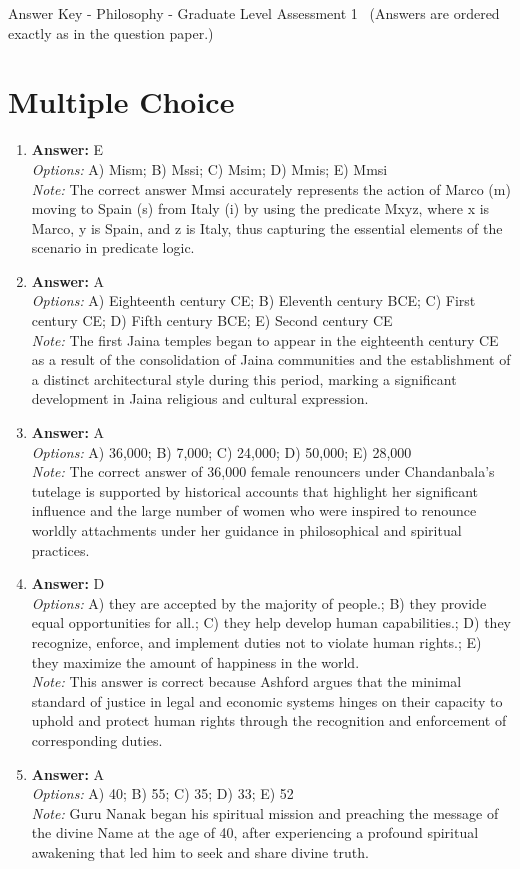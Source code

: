 \documentclass[12pt]{article}
\begin{document}
\begin{center}
Answer Key - Philosophy - Graduate Level Assessment 1 \
\small (Answers are ordered exactly as in the question paper.)
\end{center}

\section*{Multiple Choice}
\begin{enumerate}[label=\arabic*.]
\item \textbf{Answer:} E
\\ \textit{Options:} A) Mism; B) Mssi; C) Msim; D) Mmis; E) Mmsi
\\ \textit{Note:} The correct answer Mmsi accurately represents the action of Marco (m) moving to Spain (s) from Italy (i) by using the predicate Mxyz, where x is Marco, y is Spain, and z is Italy, thus capturing the essential elements of the scenario in predicate logic.
\item \textbf{Answer:} A
\\ \textit{Options:} A) Eighteenth century CE; B) Eleventh century BCE; C) First century CE; D) Fifth century BCE; E) Second century CE
\\ \textit{Note:} The first Jaina temples began to appear in the eighteenth century CE as a result of the consolidation of Jaina communities and the establishment of a distinct architectural style during this period, marking a significant development in Jaina religious and cultural expression.
\item \textbf{Answer:} A
\\ \textit{Options:} A) 36,000; B) 7,000; C) 24,000; D) 50,000; E) 28,000
\\ \textit{Note:} The correct answer of 36,000 female renouncers under Chandanbala's tutelage is supported by historical accounts that highlight her significant influence and the large number of women who were inspired to renounce worldly attachments under her guidance in philosophical and spiritual practices.
\item \textbf{Answer:} D
\\ \textit{Options:} A) they are accepted by the majority of people.; B) they provide equal opportunities for all.; C) they help develop human capabilities.; D) they recognize, enforce, and implement duties not to violate human rights.; E) they maximize the amount of happiness in the world.
\\ \textit{Note:} This answer is correct because Ashford argues that the minimal standard of justice in legal and economic systems hinges on their capacity to uphold and protect human rights through the recognition and enforcement of corresponding duties.
\item \textbf{Answer:} A
\\ \textit{Options:} A) 40; B) 55; C) 35; D) 33; E) 52
\\ \textit{Note:} Guru Nanak began his spiritual mission and preaching the message of the divine Name at the age of 40, after experiencing a profound spiritual awakening that led him to seek and share divine truth.
\end{enumerate}
\end{document}
